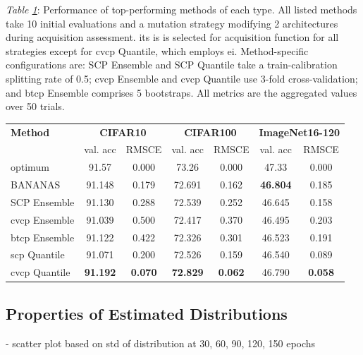 \documentclass[a4paper,oneside,bibliography=totoc]{scrbook}
\begin{document}
\begin{table}[t]

\parbox{\linewidth}{
  {\small \textit{Table \ref{tab: summary}}: Performance of top-performing methods of each type. All listed methods take 10 initial evaluations and a mutation strategy modifying 2 architectures during acquisition assessment. \gls{its} is is selected for acquisition function for all strategies except for \gls{cvcp} Quantile, which employs \gls{ei}. Method-specific configurations are: SCP Ensemble and SCP Quantile take a train-calibration splitting rate of 0.5; \gls{cvcp} Ensemble and \gls{cvcp} Quantile use 3-fold cross-validation; and \gls{btcp} Ensemble comprises 5 bootstraps. All metrics are the aggregated values over 50 trials.}  
  \vspace{1em}
}
\label{tab: summary}
\centering
\small
\renewcommand{\arraystretch}{1.3}
\begin{tabular}{l|cc|cc|cc}
\toprule
\textbf{Method} 
& \multicolumn{2}{c|}{\textbf{CIFAR10}} 
& \multicolumn{2}{c|}{\textbf{CIFAR100}} 
& \multicolumn{2}{c}{\textbf{ImageNet16-120}} \\
& val. acc & RMSCE & val. acc & RMSCE & val. acc & RMSCE \\
\midrule
optimum 
& 91.57 & 0.000 
& 73.26 & 0.000 
& 47.33 & 0.000 \\
\midrule
BANANAS
& 91.148 & 0.179 
& 72.691 & 0.162 
& \textbf{46.804} & 0.185 \\
SCP Ensemble 
& 91.130 & 0.288 
& 72.539 & 0.252 
& 46.645 & 0.158 \\
\gls{cvcp} Ensemble
& 91.039 & 0.500 
& 72.417 & 0.370 
& 46.495 & 0.203 \\
\gls{btcp} Ensemble
& 91.122 & 0.422 
& 72.326 & 0.301 
& 46.523 & 0.191 \\
\gls{scp} Quantile
& 91.071 & 0.200 
& 72.526 & 0.159 
& 46.540 & 0.089 \\
\gls{cvcp} Quantile 
& \textbf{91.192} & \textbf{0.070} 
& \textbf{72.829} & \textbf{0.062} 
& 46.790 & \textbf{0.058} \\
\bottomrule
\end{tabular}
\end{table}

\subsection{Properties of Estimated Distributions} - scatter plot based on std of distribution at 30, 60, 90, 120, 150 epochs 
\end{document}
